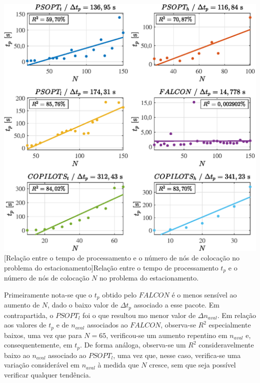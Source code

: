 \noindent
\begin{minipage}{\textwidth}
	\vspace{\onelineskip}
	\centering
	\includegraphics[scale=0.7]{fig/resultados/estacionamento/sens/t}
	[Relação entre o tempo de processamento e o número de nós de colocação no problema do estacionamento]{Relação entre o tempo de processamento $ t_p $ e o número de nós de colocação $ N $ no problema do estacionamento.}
	\label{fig:estacionamento:sensibilidade:t}
	\vspace{\onelineskip}
\end{minipage}

Primeiramente nota-se que o $t_p$ obtido pelo $FALCON$ é o menos sensível ao aumento de $N$, dado o baixo valor de $\Delta t_p$ associado a esse pacote. Em contrapartida, o $PSOPT_l$ foi o que resultou mo menor valor de $\Delta n_{aval}$. Em relação aos valores de $t_p$ e de $n_{aval}$ associados ao $FALCON$, observa-se $R^2$ especialmente baixos, uma vez que para $N = 65$, verificou-se um aumento repentino em $n_{aval}$ e, consequentemente, em $t_p$. De forma análoga, observa-se um $R^2$ consideravelmente baixo ao $n_{aval}$ associado ao $PSOPT_l$, uma vez que, nesse caso, verifica-se uma variação considerável em $ n_{aval} $ à medida que $N$ cresce, sem que seja possível verificar qualquer tendência.

